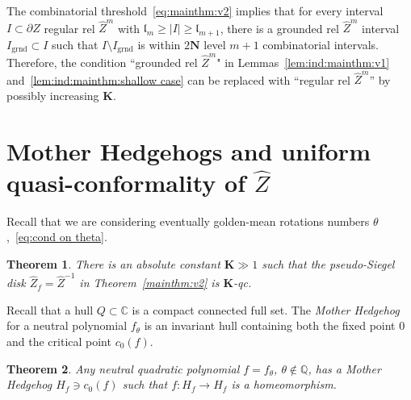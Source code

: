 \documentclass{amsart}
\newcommand{\1}{{\mathbb 1 }}
\newcommand{\bN}{{\mathbf N}}
\newcommand{\wZ}{{\widehat Z}}
\newcommand{\bK}{{\mathbf K}}
\newcommand{\length}{{\mathfrak l}}
\newcommand{\grnd}{{\operatorname{grnd}}}
\newcommand{\C}{\mathbb{C}}
\newcommand{\Q}{\mathbb{Q}}
\newtheorem{thm}{Theorem}[section]
\theoremstyle{remark}
\numberwithin{equation}{section}
\theoremstyle{definition}
\begin{document}
The combinatorial threshold~\eqref{eq:mainthm:v2} implies that for every interval $I\subset\partial Z$ regular rel $\wZ^m$ with $\length_{m}\ge  |I|\ge \length_{m+1}$, there is a grounded rel $\wZ^m$ interval $I_\grnd \subset I$ such that $I\setminus I_\grnd$ is within $2\bN$ level $m+1$ combinatorial intervals. Therefore, the condition ``grounded rel $\wZ^m$" in  Lemmas~\ref{lem:ind:mainthm:v1} and~\ref{lem:ind:mainthm:shallow case} can be replaced with ``regular rel $\wZ^m$'' by possibly increasing $\bK$. 

 





\section{Mother Hedgehogs and uniform quasi-conformality of $\wZ$}\label{s:MotherHedgehogs}
Recall that we are considering eventually golden-mean rotations numbers $\theta$,~\eqref{eq:cond on theta}.

\begin{thm}
\label{mainthm:v3}
There is an absolute constant $\bK\gg 1$ such that the pseudo-Siegel disk $\wZ_f=\wZ^{-1}$ in Theorem~\ref{mainthm:v2} is $\bK$-qc.
\end{thm}



Recall that a hull $Q\subset \C$ is a compact connected full set.
The {\em  Mother Hedgehog}~\cite{Ch} for a neutral polynomial $f_\theta$
is an invariant hull containing both the fixed point $0$ and the critical
point $c_0(f)$.

\begin{thm}
\label{mainthm:v4}
 Any neutral quadratic polynomial $f=f_\theta$, $\theta\not\in \Q$,
  has a Mother Hedgehog $H_f\ni c_0(f)$ such that $f\colon  H_f \to H_f$ is a homeomorphism.
\end{thm}
\end{document}
